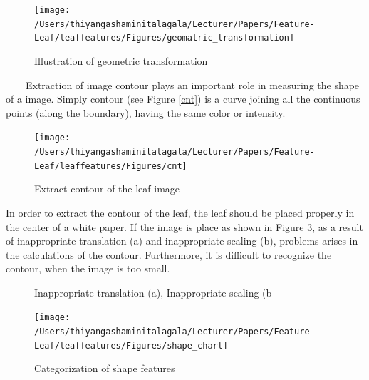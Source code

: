 \documentclass{article}
\begin{document}
\begin{figure}[!ht]

{\centering \texttt{[image: /Users/thiyangashaminitalagala/Lecturer/Papers/Feature-Leaf/leaffeatures/Figures/geomatric\_transformation]} 

}

\caption{\label{img3} Illustration of geometric transformation}\label{fig:unnamed-chunk-11}
\end{figure}

~~~~Extraction of image contour plays an important role in measuring the
shape of a image. Simply contour (see Figure \ref{cnt}) is a curve
joining all the continuous points (along the boundary), having the same
color or intensity.

\begin{figure}[!ht]

{\centering \texttt{[image: /Users/thiyangashaminitalagala/Lecturer/Papers/Feature-Leaf/leaffeatures/Figures/cnt]} 

}

\caption{\label{cnt}Extract contour of the leaf image}\label{fig:unnamed-chunk-12}
\end{figure}

In order to extract the contour of the leaf, the leaf should be placed
properly in the center of a white paper. If the image is place as shown
in Figure \ref{fig:trans}, as a result of inappropriate translation (a)
and inappropriate scaling (b), problems arises in the calculations of
the contour. Furthermore, it is difficult to recognize the contour, when
the image is too small.

\begin{figure}[!ht]

{\centering {}

}

\caption{\label{trans}Inappropriate translation (a),  Inappropriate scaling (b}\label{fig:trans}
\end{figure}

\begin{figure}[!ht]

{\centering \texttt{[image: /Users/thiyangashaminitalagala/Lecturer/Papers/Feature-Leaf/leaffeatures/Figures/shape\_chart]} 

}

\caption{\label{scalimg4}Categorization of shape features}\label{fig:unnamed-chunk-13}
\end{figure}
\end{document}
